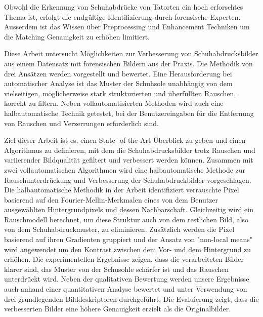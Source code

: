 \documentclass[draft,final]{vutinfth} %
\begin{document}
\begin{kurzfassung}
\par
Obwohl die Erkennung von Schuhabdrücke von Tatorten ein hoch erforschtes Thema ist, erfolgt die endgültige Identifizierung  durch forensische Experten.
Ausserdem ist das Wissen über Preprocessing und Enhancement Techniken um die Matching Genauigkeit zu erhöhen limitiert.
\par
Diese Arbeit untersucht Möglichkeiten zur Verbesserung von Schuhabdrucksbilder aus einem Datensatz mit forensischen Bildern aus der Praxis. 
Die Methodik von drei Ansätzen werden vorgestellt und bewertet. 
Eine Herausforderung bei automatischer Analyse ist das Muster der Schuhsole unabhängig von dem vielseitigen, möglicherweise stark strukturierten und überfüllten Rauschen, korrekt zu filtern.
Neben vollautomatisierten Methoden wird auch eine halbautomatische Technik getestet, bei der Benutzereingaben für die Entfernung von Rauschen und Verzerrungen erforderlich sind. 
\par
Ziel dieser Arbeit ist es, einen State- of-the-Art Überblick zu geben und einen Algorithmus zu definieren, mit dem die Schuhabdrucksbilder trotz Rauschen und variierender Bildqualität gefiltert und verbessert werden können.
Zusammen mit zwei vollautomatischen Algorithmen wird eine halbautomatische Methode zur Rauschunterdrückung und Verbesserung der Schuhabdruckbilder vorgeschlagen. 
Die halbautomatische Methodik in der Arbeit identifiziert verrauschte Pixel basierend auf den Fourier-Mellin-Merkmalen eines von dem Benutzer ausgewählten Hintergrundpixels und dessen Nachbarschaft. 
Gleichzeitig wird ein Rauschmodell berechnet, um diese Struktur auch von dem restlichen Bild, also von dem Schuhabdruckmuster, zu eliminieren. 
Zusätzlich werden die Pixel basierend auf ihren Gradienten gruppiert und der Ansatz von "non-local means" wird angewendet um den Kontrast zwischen dem Vor- und dem Hintergrund zu erhöhen.
Die experimentellen Ergebnisse zeigen, dass die verarbeiteten Bilder klarer sind, das Muster von der Schusohle schärfer ist und das Rauschen unterdrückt wird. 
Neben der qualitativen Bewertung werden unsere Ergebnisse auch anhand einer quantitativen Analyse bewertet und unter Verwendung von drei grundlegenden Bilddeskriptoren durchgeführt.
Die Evaluierung zeigt, dass die verbesserten Bilder eine höhere Genauigkeit erzielt als die Originalbilder.

\end{kurzfassung}
\end{document}
